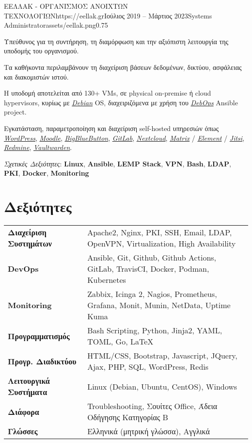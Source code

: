 \documentclass{mycv}
\begin{document}
	\begin{EntryDatedLogo}{ΕΕΛΛΑΚ - ΟΡΓΑΝΙΣΜΟΣ ΑΝΟΙΧΤΩΝ ΤΕΧΝΟΛΟΓΙΩΝ}{https://eellak.gr}{Ιούλιος 2019 -- Μάρτιος 2023}{Systems Administrator}{assets/eellak.png}{0.75}
		\begin{Itemize}
			\item Υπεύθυνος για τη συντήρηση, τη διαμόρφωση και την αξιόπιστη λειτουργία της υποδομής του οργανισμού.
			\item Τα καθήκοντα περιλαμβάνουν τη διαχείριση βάσεων δεδομένων, δικτύου, ασφάλειας και διακομιστών ιστού.
			\item Η υποδομή αποτελείται από 130+ VMs, σε physical on-premise ή cloud hypervisors, κυρίως με \href{https://www.debian.org}{\textit{Debian}} OS, διαχειριζόμενα με χρήση του \href{https://debops.org}{\textit{DebOps}} Ansible project.
			\item Εγκατάσταση, παραμετροποίηση και διαχείριση self-hosted υπηρεσιών όπως \href{https://wordpress.com}{\textit{WordPress}}, \href{https://moodle.org}{\textit{Moodle}}, \href{https://bigbluebutton.org}{\textit{BigBlueButton}}, \href{https://about.gitlab.com/install/}{\textit{GitLab}}, \href{https://nextcloud.com}{\textit{Nextcloud}}, \href{https://matrix.org}{\textit{Matrix}} / \href{https://element.io}{\textit{Element}} / \href{https://jitsi.org}{\textit{Jitsi}}, \href{https://www.redmine.org/}{\textit{Redmine}}, \href{https://vaultwarden.discourse.group/}{\textit{Vaultwarden}}.
			\item \textit{Σχετικές Δεξιότητες}: \textbf{Linux}, \textbf{Ansible}, \textbf{LEMP Stack}, \textbf{VPN}, \textbf{Bash}, \textbf{LDAP}, \textbf{PKI}, \textbf{Docker}, \textbf{Monitoring}
		\end{Itemize}
	\end{EntryDatedLogo}

	\section{Δεξιότητες}
	\begin{tabular}{m{4.5cm} m{12.5cm}}
		\textbf{Διαχείριση Συστημάτων} & Apache2, Nginx, PKI, SSH, Email, LDAP, OpenVPN, Virtualization, High Availability \\
		\textbf{DevOps}	               & Ansible, Git, Github, Github Actions, GitLab, TravisCI, Docker, Podman, Kubernetes \\
		\textbf{Monitoring}            & Zabbix, Icinga 2, Nagios, Prometheus, Grafana, Monit, Munin, NetData, Uptime Kuma \\
		\textbf{Προγραμματισμός} 	   & Bash Scripting, Python, Jinja2, YAML, TOML, Go, \LaTeX \\
		\textbf{Προγρ. Διαδικτύου}	   & HTML/CSS, Bootstrap, Javascript, JQuery, Ajax, PHP, SQL, WordPress, Redis \\
		\textbf{Λειτουργικά Συστήματα} & Linux (Debian, Ubuntu, CentOS), Windows \\
		\textbf{Διάφορα}        	   & Troubleshooting, Σουίτες Office, Άδεια Οδήγησης Κατηγορίας Β \\
		\textbf{Γλώσσες} 			   & Ελληνικά (μητρική γλώσσα), Αγγλικά 
	\end{tabular}
\end{document}
